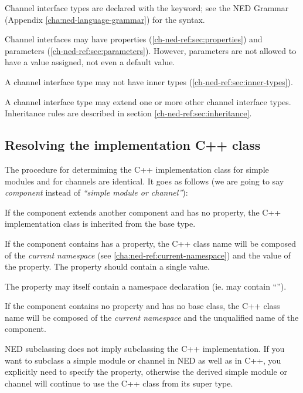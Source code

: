 Channel interface types are declared with the  keyword;
see the NED Grammar (Appendix \ref{cha:ned-language-grammar}) for the
syntax.

Channel interfaces may have properties (\ref{ch-ned-ref:sec:properties}) and
parameters (\ref{ch-ned-ref:sec:parameters}). However, parameters are not
allowed to have a value assigned, not even a default value.

A channel interface type may not have inner types (\ref{ch-ned-ref:sec:inner-types}).

A channel interface type may extend one or more other channel interface types.
Inheritance rules are described in section \ref{ch-ned-ref:sec:inheritance}.



\subsection{Resolving the implementation C++ class}
\label{ch-ned-ref:sec:resolving-cpp-class}

The procedure for determiming the C++ implementation class for simple modules
and for channels are identical. It goes as follows (we are going to say
\textit{component} instead of \textit{``simple module or channel''}):

If the component extends another component and has no
 property, the C++ implementation class is inherited from the base
type.

If the component contains has a  property, the C++ class
name will be composed of the \textit{current namespace} (see
\ref{cha:ned-ref:current-namespace}) and the value of the 
property. The  property should contain a single value.

\begin{note}
    The  property may itself contain a namespace declaration (ie.
    may contain ``\ttt{::}'').
\end{note}

If the component contains no  property and has no base
class, the C++ class name will be composed of the \textit{current namespace} and the
unqualified name of the component.

\begin{note}
    NED subclassing does not imply subclassing the C++ implementation. If you
    want to subclass a simple module or channel in NED as well as in C++, you
    explicitly need to specify the  property, otherwise the
    derived simple module or channel will continue to use the C++ class from its
    super type.
\end{note}

